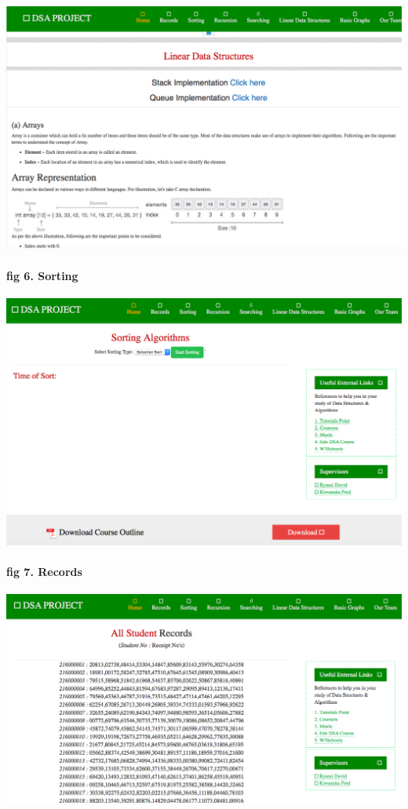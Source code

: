 \documentclass{article}
\begin{document}
\includegraphics[width=1.0\textwidth]{./linear}\\[0.1in]

\paragraph{fig 6. Sorting}

\includegraphics[width=1.0\textwidth]{./sort}\\[0.1in]

\paragraph{fig 7. Records}

\includegraphics[width=1.0\textwidth]{./record}\\[0.1in]
\end{document}
